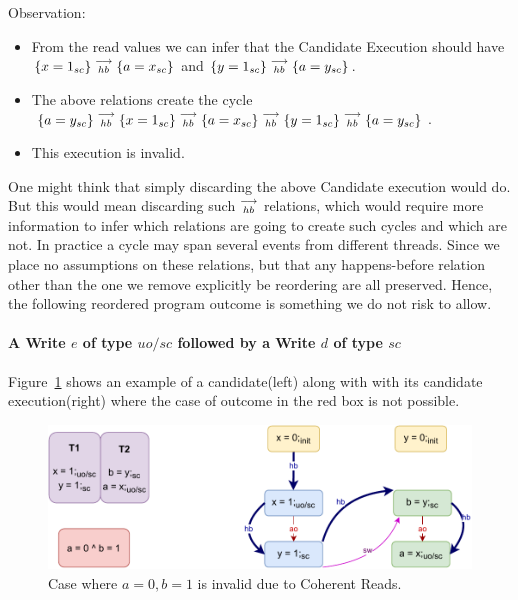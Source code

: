         Observation:
        \begin{itemize}
            \item From the read values we can infer that the Candidate Execution should have $\{x=1_{sc}\}\stackrel{\longrightarrow}{_{hb}}\{a=x_{sc}\}$ and $\{y=1_{sc}\}\stackrel{\longrightarrow}{_{hb}}\{a=y_{sc}\}$.
            \item The above relations create the cycle $\{a=y_{sc}\}\stackrel{\longrightarrow}{_{hb}}\{x=1_{sc}\}\stackrel{\longrightarrow}{_{hb}}\{a=x_{sc}\}\stackrel{\longrightarrow}{_{hb}}\{y=1_{sc}\}\stackrel{\longrightarrow}{_{hb}}\{a=y_{sc}\}$.
            \item This execution is invalid. 
        \end{itemize}

        One might think that simply discarding the above Candidate execution would do. 
        But this would mean discarding such $\stackrel{\longrightarrow}{_{hb}}$ relations, which would require more information to infer which relations are going to create such cycles and which are not. 
        In practice a cycle may span several events from different threads.
        Since we place no assumptions on these relations, but that any happens-before relation other than the one we remove explicitly be reordering are all preserved. 
        Hence, the following reordered program outcome is something we do not risk to allow.


    \paragraph{A Write $e$ of type $uo/sc$ followed by a Write $d$ of type $sc$}
        
        Figure~\ref{reord_counter:example4(a)} shows an example of a candidate(left) along with with its candidate execution(right) where the case of outcome in the red box is not possible. 
        \begin{figure}[H]
            \centering
            \includegraphics[scale=0.7]{5.InstructionReordering/4.ValidReorderingCandidate/Example7(Wuo,sc-Wsc).pdf}
            \caption{Case where $a = 0, b = 1$ is invalid due to Coherent Reads.}
            \label{reord_counter:example4(a)}
        \end{figure}
        
